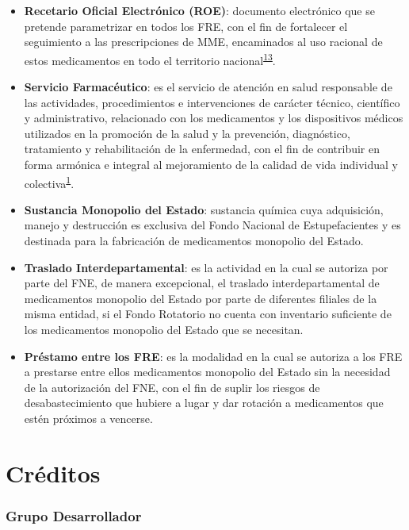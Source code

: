 \documentclass[
]{book}
\begin{document}
\begin{itemize}
\item
  \textbf{Recetario Oficial Electrónico (ROE)}: documento electrónico que se pretende parametrizar en todos los FRE, con el fin de fortalecer el seguimiento a las prescripciones de MME, encaminados al uso racional de estos medicamentos en todo el territorio nacional\textsuperscript{\protect\hyperlink{ref-CuervoBustamante2021}{13}}.
\item
  \textbf{Servicio Farmacéutico}: es el servicio de atención en salud responsable de las actividades, procedimientos e intervenciones de carácter técnico, científico y administrativo, relacionado con los medicamentos y los dispositivos médicos utilizados en la promoción de la salud y la prevención, diagnóstico, tratamiento y rehabilitación de la enfermedad, con el fin de contribuir en forma armónica e integral al mejoramiento de la calidad de vida individual y colectiva\textsuperscript{\protect\hyperlink{ref-MSPS1478-2006}{1}}.
\item
  \textbf{Sustancia Monopolio del Estado}: sustancia química cuya adquisición, manejo y destrucción es exclusiva del Fondo Nacional de Estupefacientes y es destinada para la fabricación de medicamentos monopolio del Estado.
\item
  \textbf{Traslado Interdepartamental}: es la actividad en la cual se autoriza por parte del FNE, de manera excepcional, el traslado interdepartamental de medicamentos monopolio del Estado por parte de diferentes filiales de la misma entidad, si el Fondo Rotatorio no cuenta con inventario suficiente de los medicamentos monopolio del Estado que se necesitan.
\item
  \textbf{Préstamo entre los FRE}: es la modalidad en la cual se autoriza a los FRE a prestarse entre ellos medicamentos monopolio del Estado sin la necesidad de la autorización del FNE, con el fin de suplir los riesgos de desabastecimiento que hubiere a lugar y dar rotación a medicamentos que estén próximos a vencerse.
\end{itemize}

\hypertarget{cruxe9ditos}{%
\chapter*{Créditos}\label{cruxe9ditos}}

\hypertarget{grupo-desarrollador}{%
\subsection*{Grupo Desarrollador}\label{grupo-desarrollador}}
\end{document}
